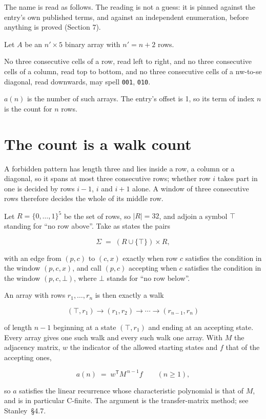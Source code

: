 \documentclass[11pt]{article}
\theoremstyle{definition}
\begin{document}
The name is read as follows. The reading is not a guess: it is pinned against the entry's own published terms, and against an independent enumeration, before anything is proved (Section 7).

Let $A$ be an $n' \times 5$ binary array with $n' = n + 2$ rows.

No three consecutive cells of a row, read left to right, and no three consecutive cells of a column, read top to bottom, and no three consecutive cells of a nw-to-se diagonal, read downwards, may spell \texttt{001}, \texttt{010}.

$a(n)$ is the number of such arrays. The entry's offset is 1, so its term of index $n$ is the count for $n$ rows.

\section{The count is a walk count}

A forbidden pattern has length three and lies inside a row, a column or a diagonal, so it spans at most three consecutive rows; whether row $i$ takes part in one is decided by rows $i-1$, $i$ and $i+1$ alone. A window of three consecutive rows therefore decides the whole of its middle row.

Let $R = \{0,\dots,1\}^{5}$ be the set of rows, so $|R| = 32$, and adjoin a symbol $\top$ standing for ``no row above''. Take as states the pairs

\[\Sigma \;=\; (R \cup \{\top\}) \times R,\]

with an edge from $(p,c)$ to $(c,x)$ exactly when row $c$ satisfies the condition in the window $(p,c,x)$, and call $(p,c)$ accepting when $c$ satisfies the condition in the window $(p,c,\bot)$, where $\bot$ stands for ``no row below''.

An array with rows $r_1,\dots,r_n$ is then exactly a walk

\[(\top,r_1) \to (r_1,r_2) \to \cdots \to (r_{n-1},r_n)\]

of length $n-1$ beginning at a state $(\top,r_1)$ and ending at an accepting state. Every array gives one such walk and every such walk one array. With $M$ the adjacency matrix, $w$ the indicator of the allowed starting states and $f$ that of the accepting ones,

\[a(n) \;=\; w^{\mathsf T} M^{\,n-1} f \qquad (n \ge 1),\]

so $a$ satisfies the linear recurrence whose characteristic polynomial is that of $M$, and is in particular C-finite. The argument is the transfer-matrix method; see Stanley~\S4.7.
\end{document}
